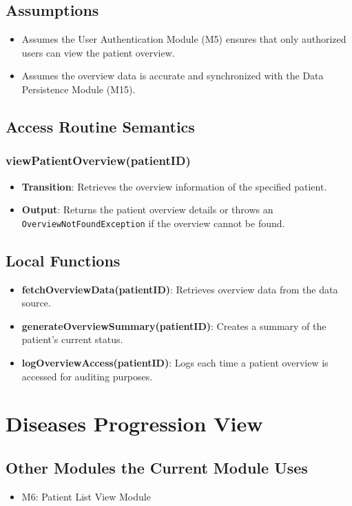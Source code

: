\documentclass[12pt, titlepage]{article}
\begin{document}
\subsection{Assumptions}
\begin{itemize}
\item Assumes the User Authentication Module (M5) ensures that only authorized users can view the patient overview.
\item Assumes the overview data is accurate and synchronized with the Data Persistence Module (M15).
\end{itemize}

\subsection{Access Routine Semantics}
\subsubsection{viewPatientOverview(patientID)}
\begin{itemize}
    \item \textbf{Transition}: Retrieves the overview information of the specified patient.
    \item \textbf{Output}: Returns the patient overview details or throws an \texttt{OverviewNotFoundException} if the overview cannot be found.
\end{itemize}

\subsection{Local Functions}
\begin{itemize}
\item \textbf{fetchOverviewData(patientID)}: Retrieves overview data from the data source.
\item \textbf{generateOverviewSummary(patientID)}: Creates a summary of the patient's current status.
\item \textbf{logOverviewAccess(patientID)}: Logs each time a patient overview is accessed for auditing purposes.
\end{itemize}
\section{Diseases Progression View}

\subsection{Other Modules the Current Module Uses}
\begin{itemize}
  \item M6: Patient List View Module
\end{itemize}
\end{document}

